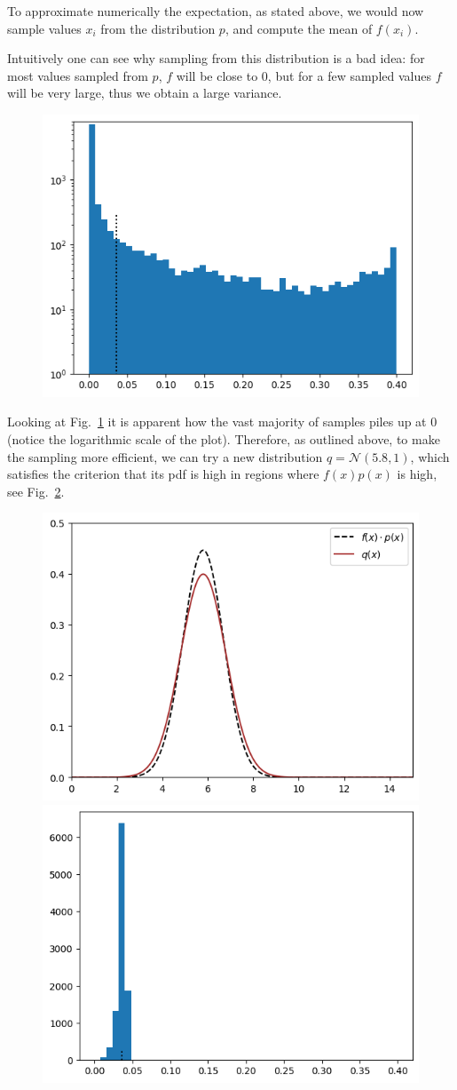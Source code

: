 \documentclass[12pt,a4paper]{book}
\begin{document}
To approximate numerically the expectation, as stated above, we would now sample values $x_i$ from the distribution $p$, and compute the mean of $f(x_i)$.

Intuitively one can see why sampling from this distribution is a bad idea: for most values sampled from $p$, $f$ will be close to 0, but for a few sampled values $f$ will be very large, thus we obtain a large variance.

\begin{figure}[htbp]
\begin{center}
\includegraphics[width=0.5\linewidth]{addons/bad_sampling}
\end{center}
\label{fig:bad_sampling}
\end{figure}

Looking at Fig.~\ref{fig:bad_sampling} it is apparent how the vast majority of samples piles up at 0 (notice the logarithmic scale of the plot). 
Therefore, as outlined above, to make the sampling more efficient, we can try a new distribution $q = \mathcal{N}(5.8, 1)$, which satisfies the criterion that its pdf is high in regions where $f(x)p(x)$ is high, see Fig.~\ref{fig:fp_and_q}.

\begin{figure}[htbp]
\begin{center}
\includegraphics[width=0.4\linewidth]{addons/fp_and_q}
\includegraphics[width=0.4\linewidth]{addons/good_sampling}
\end{center}
\label{fig:fp_and_q}
\end{figure}
\end{document}
